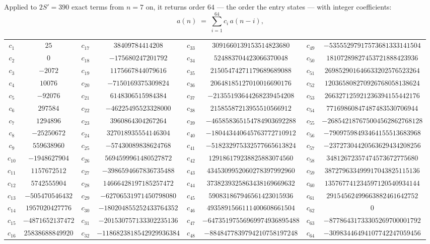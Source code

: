 \documentclass[11pt,a4paper]{article}
\theoremstyle{plain}
\theoremstyle{definition}
\begin{document}
Applied to $2S'=390$ exact terms from $n=7$ on, it returns order $64$ --- the
order the entry states --- with integer coefficients:
\[
a(n)\;=\;\sum_{i=1}^{64}c_i\,a(n-i),
\]
\begin{center}\small
\begin{tabular}{cccccccc}
$c_{1}$ & $25$ & $c_{17}$ & $38409784414208$ & $c_{33}$ & $3091660139153514823680$ & $c_{49}$ & $-53555297917573681333141504$ \\
$c_{2}$ & $0$ & $c_{18}$ & $-175680247201792$ & $c_{34}$ & $524883704423066370048$ & $c_{50}$ & $18107289827453721888423936$ \\
$c_{3}$ & $-2072$ & $c_{19}$ & $1175667844079616$ & $c_{35}$ & $21505474271179689689088$ & $c_{51}$ & $269852901646633202576523264$ \\
$c_{4}$ & $10076$ & $c_{20}$ & $-7150169375309824$ & $c_{36}$ & $20648185127010016690176$ & $c_{52}$ & $120365808270926768058138624$ \\
$c_{5}$ & $-92076$ & $c_{21}$ & $6148306515984384$ & $c_{37}$ & $-21355193644268239454208$ & $c_{53}$ & $266327125921236394155442176$ \\
$c_{6}$ & $297584$ & $c_{22}$ & $-46225495523328000$ & $c_{38}$ & $21585587213955510566912$ & $c_{54}$ & $77169860847487483530706944$ \\
$c_{7}$ & $1294896$ & $c_{23}$ & $3960864304267264$ & $c_{39}$ & $-465858365154784903692288$ & $c_{55}$ & $-268542187675004562862768128$ \\
$c_{8}$ & $-25250672$ & $c_{24}$ & $327018935554146304$ & $c_{40}$ & $-180443440645763772710912$ & $c_{56}$ & $-79097598493464155513683968$ \\
$c_{9}$ & $559638960$ & $c_{25}$ & $-57430089838624768$ & $c_{41}$ & $-518232975332577665613824$ & $c_{57}$ & $-23727304420563629434208256$ \\
$c_{10}$ & $-1948627904$ & $c_{26}$ & $5694599961480527872$ & $c_{42}$ & $129186179238825883074560$ & $c_{58}$ & $34812672357474573672775680$ \\
$c_{11}$ & $1157672512$ & $c_{27}$ & $-3986594667836735488$ & $c_{43}$ & $4345309952060278397992960$ & $c_{59}$ & $387279633499917043825115136$ \\
$c_{12}$ & $5742555904$ & $c_{28}$ & $14666428197185257472$ & $c_{44}$ & $3738239325863438169669632$ & $c_{60}$ & $135767741234597120540934144$ \\
$c_{13}$ & $-505470546432$ & $c_{29}$ & $-62706531971450798080$ & $c_{45}$ & $590831867946561423015936$ & $c_{61}$ & $29154562499663882461642752$ \\
$c_{14}$ & $1957020427776$ & $c_{30}$ & $-180204855252433764352$ & $c_{46}$ & $4935891566111400608661504$ & $c_{62}$ & $0$ \\
$c_{15}$ & $-4871652137472$ & $c_{31}$ & $-201530757133302235136$ & $c_{47}$ & $-64735197556969974936895488$ & $c_{63}$ & $-87786431733305269700001792$ \\
$c_{16}$ & $25838688849920$ & $c_{32}$ & $-1186823818542929936384$ & $c_{48}$ & $-8848477839794210758197248$ & $c_{64}$ & $-30983446494107742247059456$ \\
\end{tabular}
\end{center}
\end{document}
